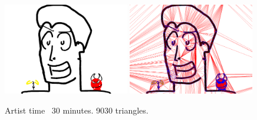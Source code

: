 \documentclass[review]{acmsiggraph}
\begin{document}







\begin{figure}
    \centering
        \includegraphics[width=0.49\textwidth]{images/facezoom}
        \includegraphics[width=0.49\textwidth]{images/facezoomtriangles}
    \caption{Artist time ~30 minutes. 9030 triangles. }
    \label{fig:face}
\end{figure}
\end{document}
